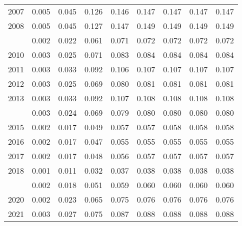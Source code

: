 \documentclass[
]{article}
\begin{document}
\begin{longtable}[t]{lrrrrrrrr}
2007 & 0.005 & 0.045 & 0.126 & 0.146 & 0.147 & 0.147 & 0.147 & 0.147\\
2008 & 0.005 & 0.045 & 0.127 & 0.147 & 0.149 & 0.149 & 0.149 & 0.149\\
\addlinespace
2009 & 0.002 & 0.022 & 0.061 & 0.071 & 0.072 & 0.072 & 0.072 & 0.072\\
2010 & 0.003 & 0.025 & 0.071 & 0.083 & 0.084 & 0.084 & 0.084 & 0.084\\
2011 & 0.003 & 0.033 & 0.092 & 0.106 & 0.107 & 0.107 & 0.107 & 0.107\\
2012 & 0.003 & 0.025 & 0.069 & 0.080 & 0.081 & 0.081 & 0.081 & 0.081\\
2013 & 0.003 & 0.033 & 0.092 & 0.107 & 0.108 & 0.108 & 0.108 & 0.108\\
\addlinespace
2014 & 0.003 & 0.024 & 0.069 & 0.079 & 0.080 & 0.080 & 0.080 & 0.080\\
2015 & 0.002 & 0.017 & 0.049 & 0.057 & 0.057 & 0.058 & 0.058 & 0.058\\
2016 & 0.002 & 0.017 & 0.047 & 0.055 & 0.055 & 0.055 & 0.055 & 0.055\\
2017 & 0.002 & 0.017 & 0.048 & 0.056 & 0.057 & 0.057 & 0.057 & 0.057\\
2018 & 0.001 & 0.011 & 0.032 & 0.037 & 0.038 & 0.038 & 0.038 & 0.038\\
\addlinespace
2019 & 0.002 & 0.018 & 0.051 & 0.059 & 0.060 & 0.060 & 0.060 & 0.060\\
2020 & 0.002 & 0.023 & 0.065 & 0.075 & 0.076 & 0.076 & 0.076 & 0.076\\
2021 & 0.003 & 0.027 & 0.075 & 0.087 & 0.088 & 0.088 & 0.088 & 0.088\\*
\end{longtable}
\end{document}
